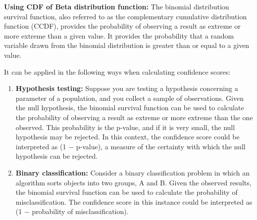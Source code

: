 \textbf{Using CDF of Beta distribution function:}
The binomial distribution survival function, also referred to as the complementary cumulative distribution function (CCDF), provides the probability of observing a result as extreme or more extreme than a given value. It provides the probability that a random variable drawn from the binomial distribution is greater than or equal to a given value.

It can be applied in the following ways when calculating confidence scores:

\begin{enumerate}
    \item \textbf{Hypothesis testing:}
    Suppose you are testing a hypothesis concerning a parameter of a population, and you collect a sample of observations. Given the null hypothesis, the binomial survival function can be used to calculate the probability of observing a result as extreme or more extreme than the one observed. This probability is the p-value, and if it is very small, the null hypothesis may be rejected. In this context, the confidence score could be interpreted as (1 $-$ p-value), a measure of the certainty with which the null hypothesis can be rejected.

    \item \textbf{Binary classification:} Consider a binary classification problem in which an algorithm sorts objects into two groups, A and B. Given the observed results, the binomial survival function can be used to calculate the probability of misclassification. The confidence score in this instance could be interpreted as (1 $-$ probability of misclassification).
\end{enumerate}

